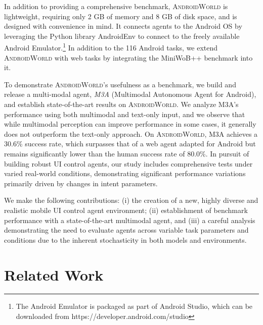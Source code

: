 \documentclass{article}
\newcommand{\system}{\textsc{AndroidWorld}\xspace}
\newcommand{\agent}{\textsc{M3A}\xspace}
\newcommand{\ntasks}{116\xspace}
\newcommand{\miniwob}{MiniWoB++\xspace}
\newcommand{\humanresult}{80.0}
\newcommand{\mthreearesult}{30.6}
\begin{document}
In addition to providing a comprehensive benchmark, \system is lightweight, requiring only 2 GB of memory and 8 GB of disk space, and is designed with convenience in mind. It connects agents to the Android OS by leveraging the Python library AndroidEnv \citep{android_env} to connect to the freely available Android Emulator.\footnote{The Android Emulator is packaged as part of Android Studio, which can be downloaded from https://developer.android.com/studio} In addition to the \ntasks Android tasks, we extend \system with web tasks by integrating the \miniwob \citep{miniwob, web-workflows18} benchmark into it.

To demonstrate \system's usefulness as a benchmark, we build and release a multi-modal agent, \emph{\agent} (Multimodal Autonomous Agent for Android), and establish state-of-the-art results on \system. We analyze \agent's performance using both multimodal and text-only input, and we observe that while multimodal perception can improve performance in some cases, it generally does not outperform the text-only approach. On \system, \agent achieves a \mthreearesult\% success rate, which surpasses that of a web agent adapted for Android but remains significantly lower than the human success rate of \humanresult\%. In pursuit of building robust UI control agents, our study includes comprehensive tests under varied real-world conditions, demonstrating significant performance variations primarily driven by changes in intent parameters.

We make the following contributions: (i) the creation of a new, highly diverse and realistic mobile UI control agent environment; (ii) establishment of benchmark performance with a state-of-the-art multimodal agent, and (iii) a careful analysis demonstrating the need to evaluate agents across variable task parameters and conditions due to the inherent stochasticity in both models and environments.

\section{Related Work}
\label{sec:related_work}
\end{document}

